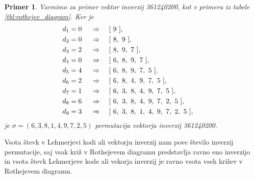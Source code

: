 \documentclass[a4paper, 12pt]{book}
\newtheorem{primer}{Primer}[chapter]
\begin{document}
\begin{primer}
\label{primer_vektor_inverzij_permutacija}
    Vzemimo za primer vektor inverzij 361240200, kot v primeru iz tabele \ref{tbl:rothejev_diagram}. Ker je
    \begin{align}
        &d_1 = 0& \ &\Rightarrow& \ &[ \ 9 \ ], \notag \\
        &d_2 = 0& \ &\Rightarrow& \ &[ \ 8, \ 9 \ ], \notag \\
        &d_3 = 2& \ &\Rightarrow& \ &[ \ 8, \ 9, \ 7 \ ], \notag \\
        &d_4 = 0& \ &\Rightarrow& \ &[ \ 6, \ 8, \ 9, \ 7 \ ], \notag \\
        &d_5 = 4& \ &\Rightarrow& \ &[ \ 6, \ 8, \ 9, \ 7, \ 5 \ ], \notag \\
        &d_6 = 2& \ &\Rightarrow& \ &[ \ 6, \ 8, \ 4, \ 9, \ 7, \ 5 \ ], \notag \\
        &d_7 = 1& \ &\Rightarrow& \ &[ \ 6, \ 3, \ 8, \ 4, \ 9, \ 7, \ 5 \ ], \notag \\
        &d_8 = 6& \ &\Rightarrow& \ &[ \ 6, \ 3, \ 8, \ 4, \ 9, \ 7, \ 2, \ 5 \ ], \notag \\
        &d_9 = 3& \ &\Rightarrow& \ &[ \ 6, \ 3, \ 8, \ 1, \ 4, \ 9, \ 7, \ 2, \ 5 \ ], \notag
    \end{align}
    je $\sigma = (6, 3, 8, 1, 4, 9, 7, 2, 5)$ permutacija vektorja inverzij 361240200.
\end{primer}

Vsota števk v Lehmerjevi kodi ali vektorju inverzij nam pove število inverzij permutacije, saj vsak križ v Rothejevem diagramu predstavlja ravno eno inverzijo in vsota števk Lehmerjeve kode ali vekorja inverzij je ravno vsota vseh križev v Rothejevem diagramu. 
\end{document}
